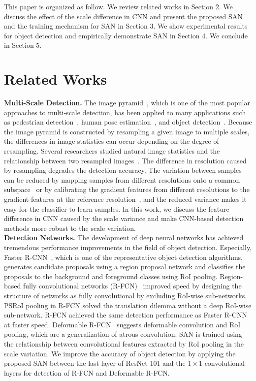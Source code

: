 \documentclass[runningheads]{llncs}
\begin{document}
This paper is organized as follow.
We review related works in Section 2.
We discuss the effect of the scale difference in CNN and present the proposed SAN and the training mechanism for SAN in Section 3.
We show experimental results for object detection and empirically demonstrate SAN in Section 4.
We conclude in Section 5.

\section{Related Works}

\noindent
\textbf{Multi-Scale Detection.} 
The image pyramid~\cite{adelson1984pyramid,gonzalez2009digital}, which is one of the most popular approaches to multi-scale detection, has been applied to many applications such as pedestrian detection~\cite{dalal2005histograms,ding2012contextual,dollar2014fast,dollar2009integral}, human pose estimation~\cite{yang2013articulated}, and object detection~\cite{felzenszwalb2010object}. 
Because the image pyramid is constructed by resampling a given image to multiple scales, the differences in image statistics can occur depending on the degree of resampling.
Several researchers studied natural image statistics and the relationship between two resampled images~\cite{field1987relations,ruderman1994statistics,ruderman1994statistics1}.
The difference in resolution caused by resampling degrades the detection accuracy.
The variation between samples can be reduced by mapping samples from different resolutions onto a common subspace~\cite{yan2013robust} or by calibrating the gradient features from different resolutions to the gradient features at the reference resolution~\cite{detector2017icip}, and the reduced variance makes  it easy for the classifier to learn samples.
In this work, we discuss the feature difference in CNN caused by the scale variance and make CNN-based detection methods more robust to the scale variation.
\\

\noindent
\textbf{Detection Networks.} 
The development of deep neural networks has achieved tremendous performance improvements in the field of object detection.
Especially, Faster R-CNN~\cite{ren2015faster}, which is one of the representative object detection algorithms,
generates candidate proposals using a region proposal network and classifies the proposals to the background and foreground classes using RoI pooling.
Region-based fully convolutional networks (R-FCN)~\cite{li2016r} improved speed by designing the structure of networks as fully convolutional by excluding RoI-wise sub-networks.
PSRoI pooling in R-FCN solved the translation dilemma without a deep RoI-wise sub-network.
R-FCN achieved the same detection performance as Faster R-CNN at faster speed.
Deformable R-FCN~\cite{dai17dcn} suggests deformable convolution and RoI pooling, which are a generalization of atrous convolution.
SAN is trained using the relationship between convolutional features extracted by RoI pooling in the scale variation.
We improve the accuracy of object detection by applying the proposed SAN between the last layer of ResNet-101 and the $1\times1$ convolutional layers for detection of R-FCN and Deformable R-FCN.
\end{document}
